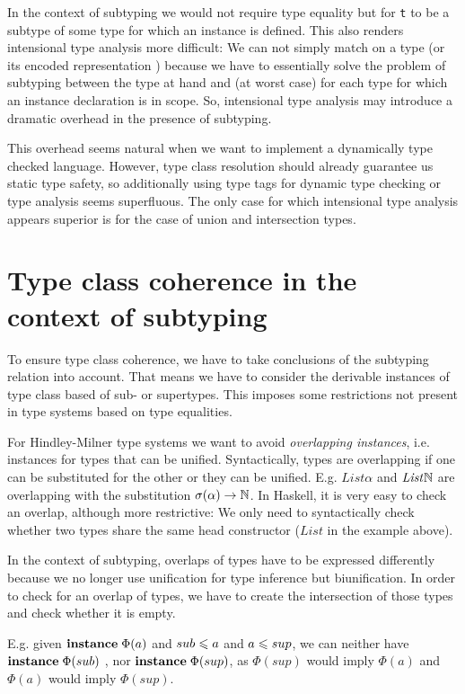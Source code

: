 In the context of subtyping we would not require type equality but for \texttt{t} to be a subtype of some type for which an instance is defined.
This also renders intensional type analysis more difficult:
We can not simply match on a type (or its encoded representation \cite{weirich2000}) because we have to essentially solve the problem of subtyping between the type at hand and (at worst case) for each type for which an instance declaration is in scope.
So, intensional type analysis may introduce a dramatic overhead in the presence of subtyping.

This overhead seems natural when we want to implement a dynamically type checked language.
However, type class resolution should already guarantee us static type safety, so additionally using type tags for dynamic type checking or type analysis seems superfluous.
The only case for which intensional type analysis appears superior is for the case of union and intersection types.

\section{Type class coherence in the context of subtyping}
  To ensure type class coherence, we have to take conclusions of the subtyping relation into account.
  That means we have to consider the derivable instances of type class based of sub- or supertypes.
  This imposes some restrictions not present in type systems based on type equalities.

  For Hindley-Milner type systems we want to avoid \emph{overlapping instances}, i.e. instances for types that can be unified. \cite{peytonjones1997type}
  Syntactically, types are overlapping if one can be substituted for the other or they can be unified.
  E.g. $\mathit{List } \alpha$ and $\mathit{List } \mathbb{N}$ are overlapping with the substitution $\sigma(\alpha) \to \mathbb{N}$.
  In Haskell, it is very easy to check an overlap, although more restrictive: We only need to syntactically check whether two types share the same head constructor ($\mathit{List}$ in the example above).

  In the context of subtyping, overlaps of types have to be expressed differently because we no longer use unification for type inference but biunification.
  In order to check for an overlap of types, we have to create the intersection of those types and check whether it is empty.

  E.g. given ${\bf instance} \; \Phi(a)$ and $sub \leqslant a$ and $a \leqslant sup$, we can neither have ${\bf instance} \; \Phi(sub)$ , nor ${\bf instance} \; \Phi(sup)$,
  as $\Phi(sup)$ would imply $\Phi(a)$ and $\Phi(a)$ would imply $\Phi(sup)$.

